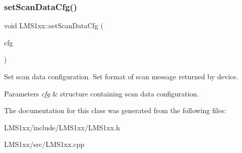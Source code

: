 \subsubsection{\texorpdfstring{set\+Scan\+Data\+Cfg()}{setScanDataCfg()}}
{\footnotesize\ttfamily void L\+M\+S1xx\+::set\+Scan\+Data\+Cfg (\begin{DoxyParamCaption}\item[{const \hyperlink{structscanDataCfg}{scan\+Data\+Cfg} \&}]{cfg }\end{DoxyParamCaption})}



Set scan data configuration. Set format of scan message returned by device. 


\begin{DoxyParams}{Parameters}
{\em cfg} & structure containing scan data configuration. \\
\hline
\end{DoxyParams}


The documentation for this class was generated from the following files\+:\begin{DoxyCompactItemize}
\item 
L\+M\+S1xx/include/\+L\+M\+S1xx/L\+M\+S1xx.\+h\item 
L\+M\+S1xx/src/L\+M\+S1xx.\+cpp\end{DoxyCompactItemize}
